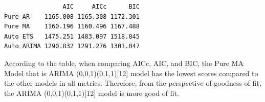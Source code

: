 \documentclass[
  letterpaper,
  DIV=11,
  numbers=noendperiod]{scrartcl}
\newenvironment{Shaded}{\begin{snugshade}}{\end{snugshade}}
\newcommand{\AttributeTok}[1]{\textcolor[rgb]{0.40,0.45,0.13}{#1}}
\newcommand{\CommentTok}[1]{\textcolor[rgb]{0.37,0.37,0.37}{#1}}
\newcommand{\FunctionTok}[1]{\textcolor[rgb]{0.28,0.35,0.67}{#1}}
\newcommand{\NormalTok}[1]{\textcolor[rgb]{0.00,0.23,0.31}{#1}}
\newcommand{\OtherTok}[1]{\textcolor[rgb]{0.00,0.23,0.31}{#1}}
\newcommand{\SpecialCharTok}[1]{\textcolor[rgb]{0.37,0.37,0.37}{#1}}
\newcommand{\StringTok}[1]{\textcolor[rgb]{0.13,0.47,0.30}{#1}}
\begin{document}
\begin{Shaded}
\end{Shaded}

\begin{verbatim}
                AIC     AICc      BIC
Pure AR    1165.008 1165.308 1172.301
Pure MA    1160.196 1160.496 1167.488
Auto ETS   1475.251 1483.097 1518.845
Auto ARIMA 1290.832 1291.276 1301.047
\end{verbatim}

According to the table, when comparing AICc, AIC, and BIC, the Pure MA
Model that is ARIMA (0,0,1)(0,1,1){[}12{]} model has the lowest scores
compared to the other models in all metrics. Therefore, from the
perspective of goodness of fit, the ARIMA (0,0,1)(0,1,1){[}12{]} model
is more good of fit.
\end{document}
